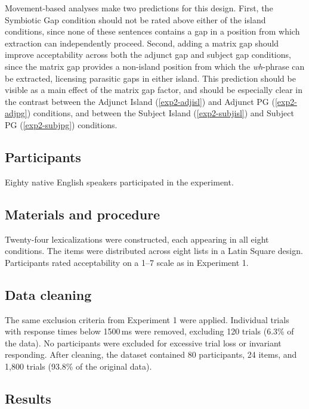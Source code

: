 \documentclass[12pt]{article}
\begin{document}
Movement-based analyses make two predictions for this design. First, the Symbiotic Gap condition should not be rated above either of the island conditions, since none of these sentences contains a gap in a position from which extraction can independently proceed. Second, adding a matrix gap should improve acceptability across both the adjunct gap and subject gap conditions, since the matrix gap provides a non-island position from which the \emph{wh}-phrase can be extracted, licensing parasitic gaps in either island. This prediction should be visible as a main effect of the matrix gap factor, and should be especially clear in the contrast between the Adjunct Island (\ref{exp2-adjisl}) and Adjunct PG (\ref{exp2-adjpg}) conditions, and between the Subject Island (\ref{exp2-subjisl}) and Subject PG (\ref{exp2-subjpg}) conditions.

\subsection{Participants}\label{sec:exp2-participants}

Eighty native English speakers participated in the experiment.

\subsection{Materials and procedure}\label{sec:exp2-materials}

Twenty-four lexicalizations were constructed, each appearing in all eight conditions. The items were distributed across eight lists in a Latin Square design. Participants rated acceptability on a 1--7 scale as in Experiment 1.

\subsection{Data cleaning}\label{sec:exp2-cleaning}

The same exclusion criteria from Experiment 1 were applied. Individual trials with response times below 1500\,ms were removed, excluding 120 trials (6.3\% of the data). No participants were excluded for excessive trial loss or invariant responding. After cleaning, the dataset contained 80 participants, 24 items, and 1,800 trials (93.8\% of the original data).

\subsection{Results}\label{sec:exp2-results}
\end{document}
